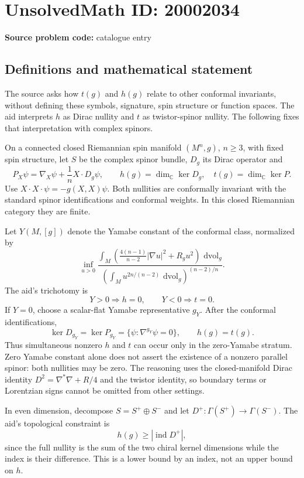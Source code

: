 \documentclass[11pt]{article}
\newcommand{\C}{\mathbb{C}}
\newcommand{\dd}{\,\mathrm{d}}
\begin{document}
\section*{UnsolvedMath ID: 20002034}
\textbf{Source problem code:} catalogue entry
\subsection{Definitions and mathematical statement}
The source asks how \(t(g)\) and \(h(g)\) relate to other conformal invariants, without defining these symbols, signature, spin structure or function spaces. The aid interprets \(h\) as Dirac nullity and \(t\) as twistor-spinor nullity. The following fixes that interpretation with complex spinors.

On a connected closed Riemannian spin manifold \((M^n,g)\), \(n\geq3\), with fixed spin structure, let \(S\) be the complex spinor bundle, \(D_g\) its Dirac operator and
\[
 P_X\psi=\nabla_X\psi+\frac1nX\cdot D_g\psi,
 \qquad h(g)=\dim_\C\ker D_g,\quad
 t(g)=\dim_\C\ker P.
\]
Use \(X\cdot X\cdot\psi=-g(X,X)\psi\). Both nullities are conformally invariant with the standard spinor identifications and conformal weights. In this closed Riemannian category they are finite.

Let \(Y(M,[g])\) denote the Yamabe constant of the conformal class, normalized by
\[
 \inf_{u>0}
 \frac{\displaystyle\int_M
 (\tfrac{4(n-1)}{n-2}|\nabla u|^2+R_gu^2)\,\dd\mathrm{vol}_g}
 {\left(\displaystyle\int_Mu^{2n/(n-2)}\,\dd\mathrm{vol}_g\right)^{(n-2)/n}}.
\]
The aid's trichotomy is
\[
 Y>0\Longrightarrow h=0,\qquad
 Y<0\Longrightarrow t=0.
\]
If \(Y=0\), choose a scalar-flat Yamabe representative \(g_Y\). After the conformal identifications,
\[
 \ker D_{g_Y}=\ker P_{g_Y}
 =\{\psi:\nabla^{g_Y}\psi=0\},\qquad h(g)=t(g).
\]
Thus simultaneous nonzero \(h\) and \(t\) can occur only in the zero-Yamabe stratum. Zero Yamabe constant alone does not assert the existence of a nonzero parallel spinor: both nullities may be zero. The reasoning uses the closed-manifold Dirac identity \(D^2=\nabla^*\nabla+R/4\) and the twistor identity, so boundary terms or Lorentzian signs cannot be omitted from other settings.

In even dimension, decompose \(S=S^+\oplus S^-\) and let \(D^+:\Gamma(S^+)\to\Gamma(S^-)\). The aid's topological constraint is
\[
 h(g)\geq|\operatorname{ind}D^+|,
\]
since the full nullity is the sum of the two chiral kernel dimensions while the index is their difference. This is a lower bound by an index, not an upper bound on \(h\).
\end{document}

